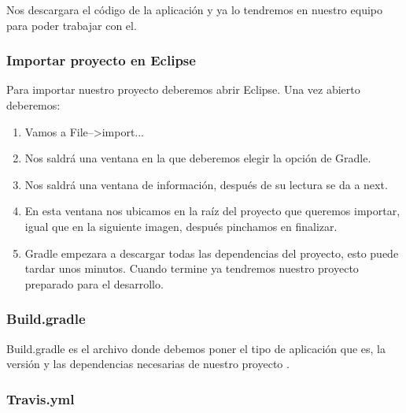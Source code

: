 
Nos descargara el código de la aplicación y ya lo tendremos en nuestro equipo para poder trabajar con el.

\subsubsection{Importar proyecto en Eclipse}\label{importar-proyecto-en-eclipse}

Para importar nuestro proyecto deberemos abrir Eclipse. Una vez abierto deberemos:

\begin{enumerate}
	\tightlist
	\item
	Vamos a File-->import...
	\item
	Nos saldrá una ventana en la que deberemos elegir la opción de Gradle.
	
	
	\item
	Nos saldrá una ventana de información, después de su lectura se da a next.
	
	\item
	En esta ventana nos ubicamos en la raíz del proyecto que queremos importar, igual que en la siguiente imagen, después pinchamos en finalizar.
	
	
	\item
	Gradle empezara a descargar todas las dependencias del proyecto, esto puede tardar unos minutos. Cuando termine ya tendremos nuestro proyecto preparado para el desarrollo.
		
	
	
\end{enumerate}

\subsubsection{Build.gradle}\label{buildgradle}

Build.gradle es el archivo donde debemos poner el tipo de aplicación que es, la versión y las dependencias necesarias de nuestro proyecto \cite{gradle}.

\subsubsection{Travis.yml}\label{travis-yml}

